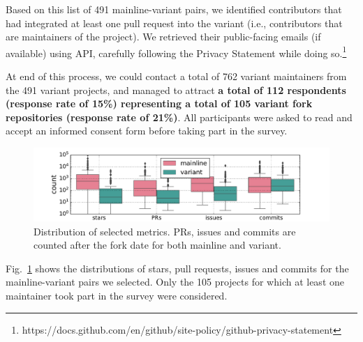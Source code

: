Based on this list of 491 mainline-variant pairs, we identified contributors that had integrated at least one pull request into the variant (i.e., contributors that are maintainers of the project).
We retrieved their public-facing emails (if available) using \gh API, carefully following the \gh Privacy Statement while doing so.\footnote{https://docs.github.com/en/github/site-policy/github-privacy-statement}

At end of this process, we could contact a total of 762 variant maintainers from the 491 variant projects, and managed to attract \textbf{a total of 112 respondents (response rate of 15\%) representing a total of 105 variant fork repositories (response rate of 21\%)}.
All participants were asked to read and accept an informed consent form before taking part in the survey.


\begin{figure}[ht]
\begin{center}
    \centering
    \includegraphics[width=\columnwidth]{pdfs/stats.pdf}
    \caption{Distribution of selected metrics. PRs, issues and commits are counted after the fork date for both mainline and variant.}
    \label{fig:stats}
\end{center}
\vspace{-.3cm}
\end{figure}

Fig.~\ref{fig:stats} shows the distributions of stars, pull requests, issues and commits for the mainline-variant pairs we selected. Only the 105 projects for which at least one maintainer took part in the survey were considered.

